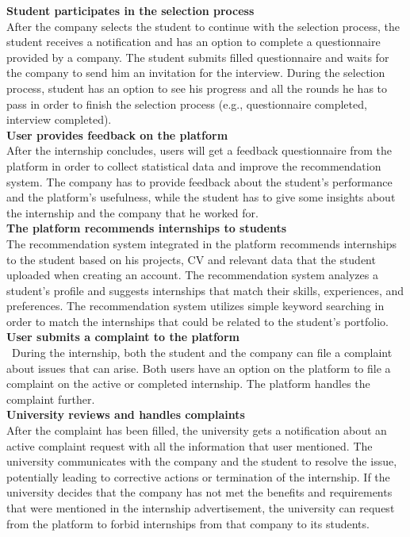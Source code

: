 \textbf{Student participates in the selection process}\\
After the company selects the student to continue with the selection process, the student receives a notification and has an option to complete a questionnaire provided by a company. The student submits filled questionnaire and waits for the company to send him an invitation for the interview. During the selection process, student has an option to see his progress and all the rounds he has to pass in order to finish the selection process (e.g., questionnaire completed, interview completed).\\

\textbf{User provides feedback on the platform}\\
After the internship concludes, users will get a feedback questionnaire from the platform in order to collect statistical data and improve the recommendation system. The company has to provide feedback about the student’s performance and the platform’s usefulness, while the student has to give some insights about the internship and the company that he worked for.\\

\textbf{The platform recommends internships to students}\\
The recommendation system integrated in the platform recommends internships to the student based on his projects, CV and relevant data that the student uploaded when creating an account. The recommendation system analyzes a student’s profile and suggests internships that match their skills, experiences, and preferences. The recommendation system utilizes simple keyword searching in order to match the internships that could be related to the student's portfolio. \\

\textbf{User submits a complaint to the platform}\\\
During the internship, both the student and the company can file a complaint about issues that can arise. Both users have an option on the platform to file a complaint on the active or completed internship. The platform handles the complaint further. \\

\textbf{University reviews and handles complaints}\\
After the complaint has been filled, the university gets a notification about an active complaint request with all the information that user mentioned. The university communicates with the company and the student to resolve the issue, potentially leading to corrective actions or termination of the internship. If the university decides that the company has not met the benefits and requirements that were mentioned in the internship advertisement, the university can request from the platform to forbid internships from that company to its students.\\

